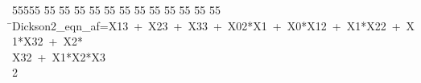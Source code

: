 %
%
\begin{tabbing}
55555 \= 55 \= 55 \= 55 \= 55 \= 55 \= 55 \= 55 \= 55 \= 55 \= 55 \= 55 \= 55 \= \>Dickson2\_eqn\_af=X13\ +\ X23\ +\ X33\ +\ X02*X1\ +\ X0*X12\ +\ X1*X22\ +\ X1*X32\ +\ X2*\\[0pt]
\>X32\ +\ X1*X2*X3\\[0pt]
2\>\end{tabbing}

